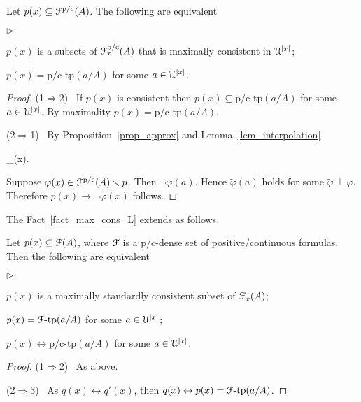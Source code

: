\documentclass{amsproc}
\newcommand{\mylabel}[1]{{#1}\hfill}
\renewenvironment{itemize}
  {\begin{list}{$\triangleright$}{%
  \setlength{\parskip}{0mm}
  \setlength{\topsep}{.4\baselineskip}
  \setlength{\rightmargin}{0mm}
  \setlength{\listparindent}{0mm}
  \setlength{\itemindent}{0mm}
  \setlength{\labelwidth}{3ex}
  \setlength{\itemsep}{.2\baselineskip}
  \setlength{\parsep}{.2\baselineskip}
  \setlength{\partopsep}{0mm}
  \setlength{\labelsep}{1ex}
  \setlength{\leftmargin}{\labelwidth+\labelsep}
  \let\makelabel\mylabel}}{%
\end{list}}
\begin{document}
{\begin{fact}\label{fact_max_cons_L}
  Let $p(x)\subseteq{\EuScript F}^{\rm p/c}(A)$.
  The following are equivalent
  \begin{itemize}
    \item[1.] $p(x)$ is a subsets of ${\EuScript F}^{\rm p/c}_x(A)$ that is maximally consistent in ${\EuScript U}^{|x|}$;
    \item[2.] $p(x)=\mbox{p/c-tp}(a/A)$ for some $a\in{\EuScript U}^{|x|}$.
  \end{itemize}
\end{fact}

\begin{proof}
  (1$\Rightarrow$2) \ 
  If $p(x)$ is consistent then $p(x)\subseteq\mbox{p/c-tp}(a/A)$  for some $a\in{\EuScript U}^{|x|}$.
  By maximality $p(x)=\mbox{p/c-tp}(a/A)$.

  (2$\Rightarrow$1) \ 
  By Proposition~\ref{prop_approx} and Lemma~\ref{lem_interpolation}

  \ceq{\hfill\varphi(x)}
  {\leftrightarrow}
  {\bigwedge_{\tilde\varphi\perp\varphi}\neg\tilde\varphi(x).}

  Suppose $\varphi(x)\in{\EuScript F}^{\rm p/c}(A)\smallsetminus  p$.
  Then $\neg\varphi(a)$.
  Hence $\tilde\varphi(a)$ holds for some $\tilde\varphi\perp\varphi$.
  Therefore $p(x)\rightarrow\neg\varphi(x)$ follows.
\end{proof}

The Fact~\ref{fact_max_cons_L} extends as follows.

\begin{fact}\label{fact_max_cons_F}
  Let $p(x)\subseteq{\EuScript F}(A)$, where ${\EuScript F}$ is a p/c-dense set of positive/continuous formulas.
  Then the following are equivalent 
  \begin{itemize}
    \item[1.] $p(x)$ is a maximally standardly consistent subset of ${\EuScript F}_x(A)$;
    \item[2.] $p(x)={\EuScript F}\mbox{-tp}(a/A)$ for some $a\in{\EuScript U}^{|x|}$;
    \item[3.] $p(x)\leftrightarrow\mbox{p/c-tp}(a/A)$ for some $a\in{\EuScript U}^{|x|}$.
  \end{itemize}

\end{fact}
  
\begin{proof}
  (1$\Rightarrow$2) \ 
  As above.
  
  (2$\Rightarrow$3) \ 
  As $q(x)\leftrightarrow q'(x)$, then $q(x)\leftrightarrow p(x)={\EuScript F}\mbox{-tp}(a/A)$.


\end{proof}}
\end{document}

